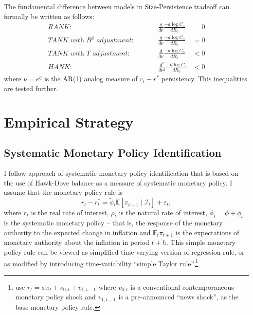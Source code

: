 \documentclass[12pt]{article}
\numberwithin{equation}{section}
\begin{document}
The fundamental difference between models in Size-Persistence tradeoff can formally be written as follows:
\begin{align}
    \textit{RANK:}&\qquad& \frac{d}{d\nu}\frac{-d\log C_0}{dR_0}&=0     \label{eq:SizePersistenceRANK}\\
\textit{TANK with $B^g$ adjustment:}&\qquad& \frac{d}{d\nu}\frac{-d\log C_0}{dR_0}&= 0     \label{eq:SizePersistenceTANK_B}\\
\textit{TANK with $T$ adjustment:}&\qquad& \frac{d}{d\nu}\frac{-d\log C_0}{dR_0}&< 0     \label{eq:SizePersistenceTANK_B}\\
\textit{HANK:}& \qquad& 
    \frac{d^2}{d\nu ^2}\frac{-d\log C_0}{dR_0}&<0
    \label{eq:SizePersistenceHANK}
\end{align}
where $\nu=e^{\eta}$ is the AR(1) analog measure of $r_t-r^*$ persistency. 
This inequalities are tested further.


\section{Empirical Strategy}
\subsection{Systematic Monetary Policy Identification}

I follow \citet{HIM2023} approach of systematic monetary policy identification that is based on the use of Hawk-Dove balance as a measure of systematic monetary policy. 
I assume that the monetary policy rule is 
\[r_t-r_t^*=\tilde\phi_t\mathbb{E}\left[\pi_{t+1}\mid \mathcal{I}_t\right]+\varepsilon_t,\]
where $r_t$ is the real rate of interest, $\rho_t$ is the natural rate of interest, $\tilde \phi_t=\phi+\phi_t$ is the systematic monetary policy -- that is, the response of the monetary authority to the expected change in inflation and $\mathbb{E}_t\pi_{t+1}$ is the expectations of monetary authority about the inflation in period $t+h$. 
This simple monetary policy rule can be viewed as simplified time-varying version of \citet{RomerRomer2004} regression rule, or as modified by introducing time-variability \citet{McKayWolf2023} ``simple Taylor rule''.\footnote{\citet{McKayWolf2023} use $r_t=\phi\pi_t+v_{0,t}+v_{1,t-1}$ where $v_{0,t}$ is a conventional contemporaneous monetary policy shock and $v_{1,t-1}$ is a pre-announced ``news shock'', as the base monetary policy rule.} 
\end{document}
